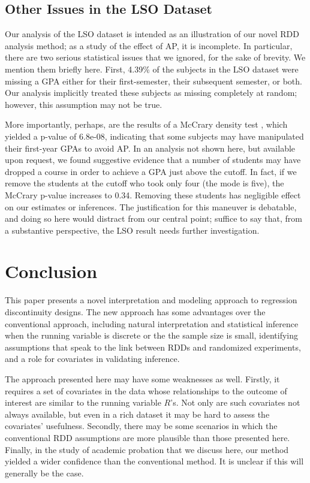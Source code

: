 \documentclass[12pt]{article}
\begin{document}
\subsection{Other Issues in the LSO Dataset}
Our analysis of the LSO dataset is intended as an illustration of our novel RDD analysis method; as a study of the effect of AP, it is incomplete.
In particular, there are two serious statistical issues that we ignored, for the sake of brevity.
We mention them briefly here.
First, 4.39\% of the subjects in the LSO dataset were missing a GPA either for their first-semester, their subsequent semester, or both.
Our analysis implicitly treated these subjects as missing completely at random; however, this assumption may not be true.

More importantly, perhaps, are the results of a McCrary density test
\citep{mccrary2008manipulation}, which yielded a p-value of
6.8e-08, indicating that some subjects may have manipulated their
first-year GPAs to avoid AP.
In an analysis not shown here, but available upon request, we found
suggestive evidence that a number of students may have dropped a
course in order to achieve a GPA just above the cutoff.
In fact, if we remove the students at the cutoff who took only four
(the mode is five), the McCrary p-value increases to 0.34.
Removing these students has negligible effect on our estimates or inferences.
The justification for this maneuver is debatable, and doing so here
would distract from our central point; suffice to say that, from a
substantive perspective, the LSO result needs further investigation.

\section{Conclusion}
This paper presents a novel interpretation and modeling approach to
regression discontinuity designs.
The new approach has some advantages over the conventional approach,
including natural interpretation and statistical inference when the
running variable is discrete or the the sample size is small,
identifying assumptions that speak to the link between RDDs and
randomized experiments, and a role for covariates in validating inference.

The approach presented here may have some weaknesses as well.
Firstly, it requires a set of covariates in the data whose relationships to the outcome of interest are similar to the running variable $R$'s.
Not only are such covariates not always available, but even in a rich dataset it may be hard to assess the covariates' usefulness.
Secondly, there may be some scenarios in which the conventional RDD assumptions are more plausible than those presented here.
Finally, in the study of academic probation that we discuss here, our method
yielded a wider confidence than the conventional method.
It is unclear if this will generally be the case.
\end{document}
